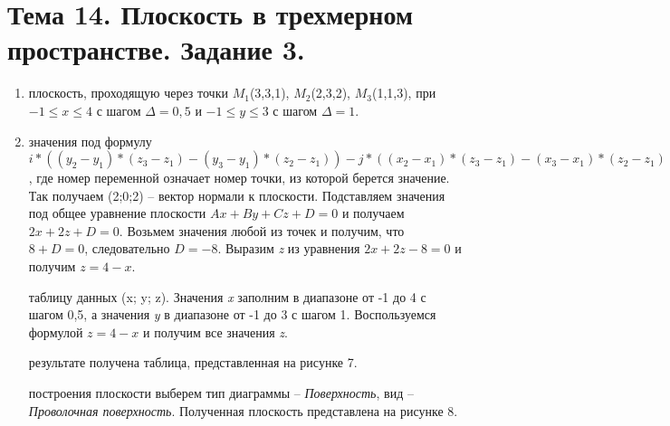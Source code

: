 \section{Тема 14. Плоскость в трехмерном пространстве. Задание 3.}
\label{sec:task14}

\begin{enumerate}
	\item{} плоскость, проходящую через точки $M_1$(3,3,1), $M_2$(2,3,2), $M_3$(1,1,3), при $-1 \leq x \leq 4$ с шагом $\Delta = 0,5$ и $-1 \leq y \leq 3$ с шагом $\Delta = 1$.
	\item{} значения под формулу $i * ((y_2 - y_1) * (z_3 - z_1) - (y_3 - y_1) * (z_2 - z_1)) - j * ((x_2 - x_1) * (z_3 - z_1) - (x_3 - x_1) * (z_2 - z_1)) + k * ((x_2 - x_1) * (y_3 - y_1) - (x_3 - x_1) * (y_2 - y_1))$, где номер переменной означает номер точки, из которой берется значение. Так получаем (2;0;2) -- вектор нормали к плоскости. Подставляем значения под общее уравнение плоскости $Ax + By + Cz + D = 0$ и получаем $2x + 2z + D = 0$. Возьмем значения любой из точек и получим, что $8 + D = 0$, следовательно $D = -8$. Выразим \textit{z} из уравнения $2x + 2z - 8 = 0$ и получим $z = 4 - x$.
	\begin{item}
		 таблицу данных (x; y; z). Значения \textit{x} заполним в диапазоне от -1 до 4 с шагом 0,5, а значения \textit{y} в диапазоне от -1 до 3 с шагом 1. Воспользуемся формулой $z = 4 - x$ и получим все значения \textit{z}.

		 результате получена таблица, представленная на рисунке 7.

        \newpage

		 построения плоскости выберем тип диаграммы -- \textit{Поверхность}, вид -- \textit{Проволочная поверхность}. Полученная плоскость представлена на рисунке 8.

	\end{item}
\end{enumerate}